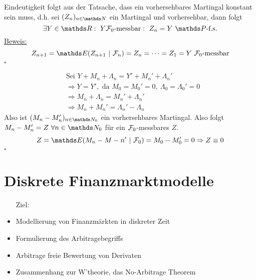 Eindeutigkeit folgt aus der Tatsache, dass ein vorhersehbares Martingal konstant sein muss, d.h. sei $(Z_n)_{n\in\N}$ ein Martingal und vorhersehbar, dann folgt 
\[
\exists Y\in\R:~Y \F_0\text{-messbar}:~Z_n=Y~\Pw\text{-f.s.}
\]
\uline{Beweis:} 
\[
Z_{n+1}=\E(Z_{n+1}~|~\F_n)=Z_n=\dots=Z_1=Y ~ \F_0\text{-messbar} 
\] 
\hfill $\square$

\begin{equation*}
\begin{aligned}
	&\text{Sei } Y+M_n+\Lambda_n=Y'+M_n'+\Lambda_n'\\
	&\Rightarrow Y=Y', \text{ da } M_0=M_0'=0,~ \Lambda_0=\Lambda_0'=0\\
	&\Rightarrow M_n+\Lambda_n=M_n'+\Lambda_n'\\
	&\Rightarrow M_n+M_n'=\Lambda_n'-\Lambda_n
\end{aligned}
\end{equation*}
Also ist $(M_n-M_n')_{n\in \N_0}$ ein vorhersehbares Martingal. Also folgt $M_n-M_n'=Z~\forall n\in \N_0$ für ein $\mathcal{F}_0$-messbares $Z$.
\[
Z=\E(M_n-M-n'~|~\F_0)=M_0-M_0'=0 \Rightarrow Z\equiv 0 
\]
\hfill $\square$


\section{Diskrete Finanzmarktmodelle}
\label{sec:disk_finanzmarktmodelle}
\begin{itemize}
	\item[Ziel:]
	\item Modellierung von Finanzmärkten in diskreter Zeit
	\item Formulierung des Arbitragebegriffs
	\item Arbitrage freie Bewertung von Derivaten
	\item Zusammenhang zur W'theorie, das No-Arbitrage Theorem
\end{itemize}

